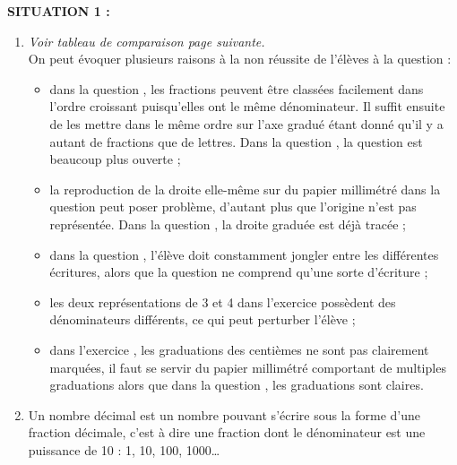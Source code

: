 {\bf SITUATION 1 :} \\
\begin{enumerate}
   \item {\it Voir tableau de comparaison page suivante.} \\
   On peut évoquer plusieurs raisons à la non réussite de l'élèves à la question  :
   \begin{itemize}
      \item dans la question , les fractions peuvent être classées facilement dans l'ordre croissant puisqu'elles ont le même dénominateur. Il suffit ensuite de les mettre dans le même ordre sur l'axe gradué étant donné qu'il y a autant de fractions que de lettres. Dans la question , la question est beaucoup plus ouverte ;
      \item la reproduction de la droite elle-même sur du papier millimétré dans la question  peut poser problème, d'autant plus que l'origine n'est pas représentée. Dans la question , la droite graduée est déjà tracée ;
      \item dans la question , l'élève doit constamment \og jongler \fg{} entre les différentes écritures, alors que la question  ne comprend qu'une sorte d'écriture ;
      \item les deux représentations de 3 et 4 dans l'exercice  possèdent des dénominateurs différents, ce qui peut perturber l'élève ;
      \item dans l'exercice , les graduations des centièmes ne sont pas clairement marquées, il faut se servir du papier millimétré comportant de multiples graduations alors que dans la question , les graduations sont claires.
   \end{itemize}
   \item Un nombre décimal est un nombre pouvant s'écrire sous la forme d'une fraction décimale, c'est à dire une fraction dont le dénominateur est une puissance de 10 : 1, 10, 100, 1000\dots \\
\end{enumerate}

